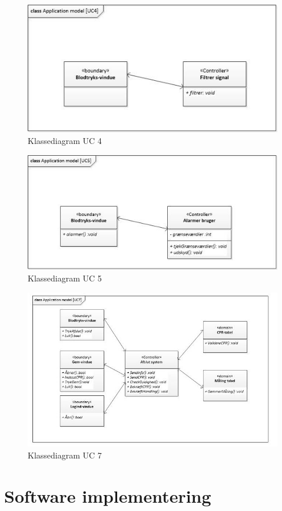 \begin{figure}[H]
	\centering
	\includegraphics[width=1\textwidth]{Figurer/ISE/classAppModelUC4}
	\caption{Klassediagram UC 4}
	\label{classApp UC4}
\end{figure}

\begin{figure}[H]
	\centering
	\includegraphics[width=1\textwidth]{Figurer/ISE/classAppModelUC5}
	\caption{Klassediagram UC 5}
	\label{classApp UC5}
\end{figure}



\begin{figure}[H]
	\centering
	\includegraphics[width=1\textwidth]{Figurer/ISE/classAppModelUC7}
	\caption{Klassediagram UC 7}
	\label{classApp UC7}
\end{figure}

\section{Software implementering}



 







